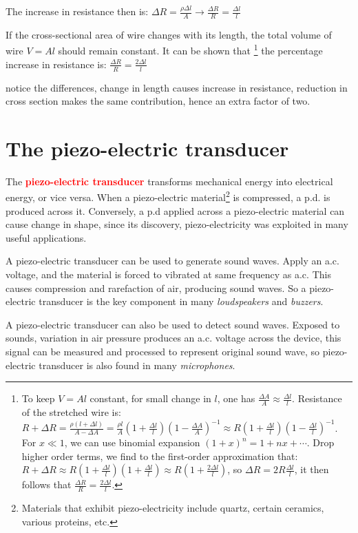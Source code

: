 \documentclass[a4paper,12pt]{book}
\newcommand{\piste}{{\fontencoding{U}\fontfamily{futs}\selectfont\char 49\relax}}
\newcommand{\keypoint}[1]{\textbf{\textcolor{red}{#1}}}
\newcommand{\ra}{\rightarrow}
\newcommand{\piste}{\textsuperscript{$\star$}}
\newcommand{\keypoint}[1]{\textbf{\textcolor{red}{#1}}}
\begin{document}
The increase in resistance then is: $\Delta R = \frac{\rho\Delta l}{A} \ra \boxed{\frac{\Delta R}{R} = \frac{\Delta l}{l}}$

If the cross-sectional area of wire changes with its length, the total volume of wire $V=Al$ should remain constant. It can be shown that \footnote{To keep $V=Al$ constant, for small change in $l$, one has $\frac{\Delta A}{A} \approx \frac{\Delta l}{l}$. Resistance of the stretched wire is: $R+\Delta R = \frac{\rho(l+\Delta l)}{A-\Delta A} = \frac{\rho l}{A} \left(1 + \frac{\Delta l}{l}\right) \left(1 - \frac{\Delta A}{A}\right)^{-1} \approx R \left(1 + \frac{\Delta l}{l}\right) \left(1 - \frac{\Delta l}{l}\right)^{-1}$. For $x\ll1$, we can use binomial expansion $(1+x)^n = 1 + nx + \cdots$. Drop higher order terms, we find to the first-order approximation that: $R+\Delta R \approx R \left(1 + \frac{\Delta l}{l}\right) \left(1 + \frac{\Delta l}{l}\right) \approx R\left( 1 + \frac{2\Delta l}{l}\right)$, so $\Delta R = 2R\frac{\Delta l}{l}$, it then follows that $\frac{\Delta R}{R} = \frac{2\Delta l}{l}$.}
 the percentage increase in resistance is: $\boxed{\frac{\Delta R}{R} = \frac{2\Delta l}{l}}$

notice the differences, change in length causes increase in resistance, reduction in cross section makes the same contribution, hence an extra factor of two.

\section{\piste The piezo-electric transducer}\label{ch-piezo}

The \keypoint{piezo-electric transducer} transforms mechanical energy into electrical energy, or vice versa. When a piezo-electric material\footnote{Materials that exhibit piezo-electricity include quartz, certain ceramics, various proteins, etc.} is compressed, a p.d. is produced across it. Conversely, a p.d applied across a piezo-electric material can cause change in shape, since its discovery, piezo-electricity was exploited in many useful applications.

A piezo-electric transducer can be used to generate sound waves. Apply an a.c. voltage, and the material is forced to vibrated at same frequency as a.c. This causes compression and rarefaction of air, producing sound waves. So a piezo-electric transducer is the key component in many \emph{loudspeakers} and \emph{buzzers}.

A piezo-electric transducer can also be used to detect sound waves. Exposed to sounds, variation in air pressure produces an a.c. voltage across the device, this signal can be measured and processed to represent original sound wave, so piezo-electric transducer is also found in many \emph{microphones}.
\end{document}
